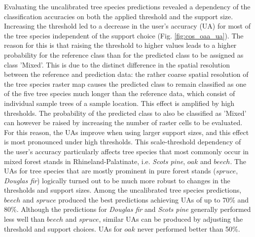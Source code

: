 Evaluating the uncalibrated tree species predictions revealed a dependency of the classification accuracies on both the applied threshold and the support size. Increasing the threshold led to a decrease in the user's accuracy (UA) for most of the tree species independent of the support choice (Fig. \ref{fig:cos_oaa_ua}). The reason for this is that raising the threshold to higher values leads to a higher probability for the reference class than for the predicted class to be assigned as class 'Mixed'. This is due to the distinct difference in the spatial resolution between the reference and prediction data: the rather coarse spatial resolution of the tree species raster map causes the predicted class to remain classified as one of the five tree species much longer than the reference data, which consist of individual sample trees of a sample location. This effect is amplified by high thresholds. The probability of the predicted class to also be classified as 'Mixed' can however be raised by increasing the number of raster cells to be evaluated. For this reason, the UAs improve when using larger support sizes, and this effect is most pronounced under high thresholds. This scale-threshold dependency of the user's accuracy particularly affects tree species that most commonly occur in mixed forest stands in Rhineland-Palatinate, i.e. \textit{Scots pine}, $oak$ and $beech$. The UAs for tree species that are mostly prominent in pure forest stands ($spruce$, \textit{Douglas fir}) logically turned out to be much more robust to changes in the thresholds and support sizes. Among the uncalibrated tree species predictions, $beech$ and $spruce$ produced the best predictions achieving UAs of up to 70\% and 80\%.  Although the predictions for \textit{Douglas fir} and \textit{Scots pine} generally performed less well than $beech$ and $spruce$, similar UAs can be produced by adjusting the threshold and support choices. UAs for $oak$ never performed better than 50\%.

